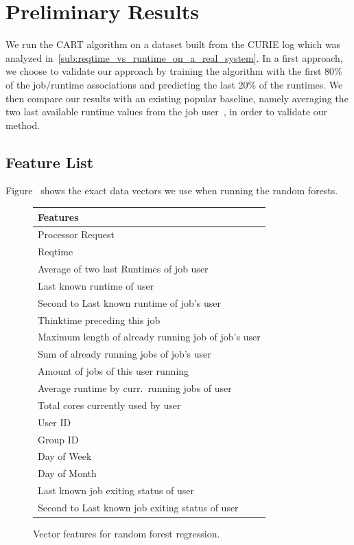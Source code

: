 \documentclass{article}
\begin{document}

\section{Preliminary Results}
\label{sec:preliminary_results}
We run the CART algorithm on a dataset built from the CURIE log which was analyzed in~\ref{sub:reqtime_vs_runtime_on_a_real_system}. In a first approach, we choose to validate our approach by training the algorithm with the first 80\% of the job/runtime associations and predicting the last 20\% of the runtimes. We then compare our results with an existing popular baseline, namely averaging the two last available runtime values from the job user~\cite{tsafir}, in order to validate our method.

\subsection{Feature List}
\label{sub:feature_list}
Figure~\cite{fig:features} shows the exact data vectors we use when running the random forests.

\begin{figure}[!ht]
  \centering
  \begin{tabular}{|l|}
    \hline
    Features \\
    \hline
    Processor Request  \\
    Reqtime  \\
    Average of two last Runtimes of job user \\
    Last known runtime of user\\
    Second to Last known runtime of job's user \\
    Thinktime preceding this job \\
    Maximum length of already running job of job's user\\
    Sum of already running jobs of job's user\\
    Amount of jobs of this user running \\
    Average runtime by curr.\ running jobs of user\\
    Total cores currently used by user\\
    User ID \\
    Group ID\\
    Day of Week\\
    Day of Month\\
    Last known job exiting status of user\\
    Second to  Last known job exiting status of user\\
    \hline
  \end{tabular}
  \caption{Vector features for random forest regression.}
  \label{fig:features}
\end{figure}
\end{document}
